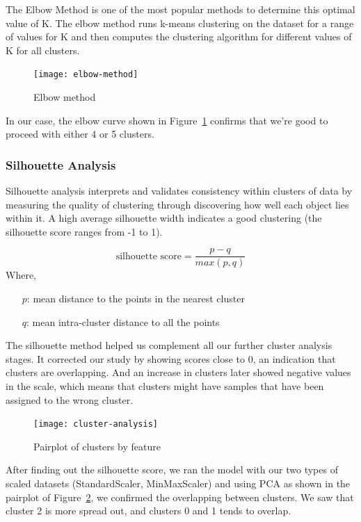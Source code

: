 \documentclass{swfuthesise}
\begin{document}
The Elbow Method is one of the most popular methods to determine this optimal value of K. The elbow method runs k-means clustering on the dataset for a range of values for K and then computes the clustering algorithm for different values of K for all clusters.

\begin{figure}[!htp]
  \centering \texttt{[image: elbow-method]}
  \caption{Elbow method\label{fig:elbow}}  
\end{figure}
  
In our case, the elbow curve shown in Figure~\ref{fig:elbow} confirms that we're good to proceed with either 4 or 5 clusters.

\subsubsection{Silhouette Analysis}

Silhouette analysis interprets and validates consistency within clusters of data by measuring the quality of clustering through discovering how well each object lies within it. A high average silhouette width indicates a good clustering (the silhouette score ranges from -1 to 1).

\[
    \text{silhouette score}=\frac{p-q}{max(p,q)}
\]
Where,
\begin{itemize}[itemsep=-1.5ex]
\item[\(p\):] mean distance to the points in the nearest cluster
\item[\(q\):] mean intra-cluster distance to all the points
\end{itemize}

The silhouette method helped us complement all our further cluster analysis stages. It corrected our study by showing scores close to 0, an indication that clusters are overlapping. And an increase in clusters later showed negative values in the scale, which means that clusters might have samples that have been assigned to the wrong cluster.

\begin{figure}[!htp]
    \centering
    \texttt{[image: cluster-analysis]}
    \caption{Pairplot of clusters by feature\label{fig:cluster-analysis}}    
\end{figure}

After finding out the silhouette score, we ran the model with our two types of scaled datasets (StandardScaler, MinMaxScaler) and using PCA as shown in the pairplot of Figure~\ref{fig:cluster-analysis}, we confirmed the overlapping between clusters. We saw that cluster 2 is more spread out, and clusters 0 and 1 tends to overlap. 
\end{document}
